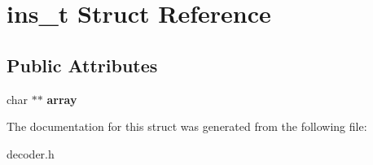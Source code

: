 \hypertarget{structins__t}{}\section{ins\+\_\+t Struct Reference}
\label{structins__t}
\subsection*{Public Attributes}
\begin{DoxyCompactItemize}
\item 
\hypertarget{structins__t_a6dd6976864faa9c8d34ef5e3f1b4eb89}{}char $\ast$$\ast$ {\bfseries array}\label{structins__t_a6dd6976864faa9c8d34ef5e3f1b4eb89}

\end{DoxyCompactItemize}


The documentation for this struct was generated from the following file\+:\begin{DoxyCompactItemize}
\item 
decoder.\+h\end{DoxyCompactItemize}
